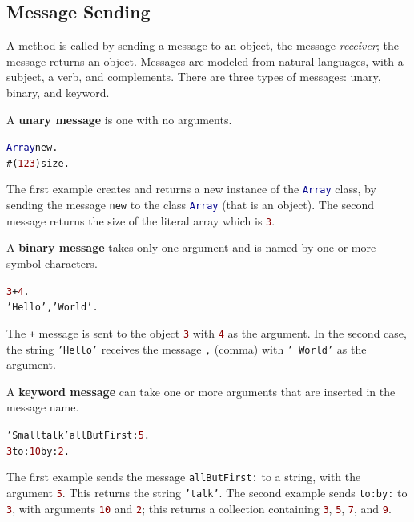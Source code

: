 \documentclass[notumble]{leaflet}
\makeatletter
\newenvironment{displaycode}{%
     \par
     \hspace{1.5em}\begin{minipage}{\linewidth}
       \begin{alltt}\small}{
       \end{alltt}
     \end{minipage}
     \par}
\newcommand{\code}[1]{\foreignlanguage{english}{\texttt{#1}}}
\makeatother
\begin{document}
\clearpage

\subsection{Message Sending}

A method is called by sending a message to an object, the message
\emph{receiver}; the message returns an object. Messages are modeled
from natural languages, with a subject, a verb, and complements. There
are three types of messages: unary, binary, and keyword.

A \textbf{unary message} is one with no arguments.

\begin{displaycode}
\textcolor{darkBlue}{Array} new.
#(\textcolor{darkRed}{1 2 3}) size.
\end{displaycode}

The first example creates and returns a new instance of the
\textcolor{darkBlue}{\code{Array}} class, by sending the message \code{new} to the class
\textcolor{darkBlue}{\code{Array}} (that is an object). The second message returns the size
of the literal array which is \textcolor{darkRed}{\code{3}}.

A \textbf{binary message} takes only one
argument and is named by one or more symbol characters.

\begin{displaycode}
\textcolor{darkRed}{3} + \textcolor{darkRed}{4}.
\textcolor{string}{'Hello'}, \textcolor{string}{' World'}.
\end{displaycode}

The \code{+} message is sent to the object
\textcolor{darkRed}{\code{3}} with \textcolor{darkRed}{\code{4}} as
the argument. In the second case, the string
\textcolor{string}{\code{'Hello'}} receives the message \code{,}
(comma) with \textcolor{string}{\code{'~World'}} as the argument.

A \textbf{keyword message} can take one or more
arguments that are inserted in the message name.

\begin{displaycode}
\textcolor{string}{'Smalltalk'} allButFirst: \textcolor{darkRed}{5}.
\textcolor{darkRed}{3} to: \textcolor{darkRed}{10} by: \textcolor{darkRed}{2}.
\end{displaycode}

The first example sends the message \code{allButFirst:} to a string,
with the argument \textcolor{darkRed}{\code{5}}. This returns the
string \textcolor{string}{\code{'talk'}}. The second example sends
\code{to:by:} to \textcolor{darkRed}{\code{3}}, with arguments
\textcolor{darkRed}{\code{10}} and \textcolor{darkRed}{\code{2}}; this
returns a collection containing \textcolor{darkRed}{\code{3}},
\textcolor{darkRed}{\code{5}}, \textcolor{darkRed}{\code{7}}, and
\textcolor{darkRed}{\code{9}}.
\end{document}
